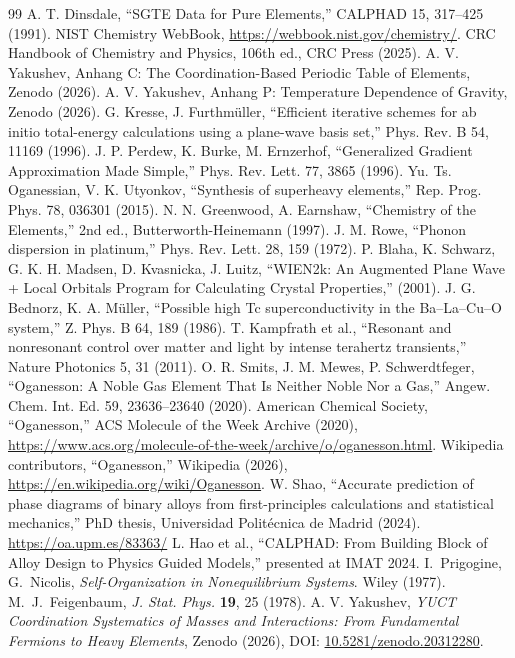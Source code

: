 \documentclass[12pt,a4paper]{article}
\theoremstyle{remark}
\begin{document}
	\begin{thebibliography}{99}
		 A. T. Dinsdale, ``SGTE Data for Pure Elements,'' CALPHAD 15, 317–425 (1991).
		 NIST Chemistry WebBook, \url{https://webbook.nist.gov/chemistry/}.
		 CRC Handbook of Chemistry and Physics, 106th ed., CRC Press (2025).
		 A. V. Yakushev, Anhang C: The Coordination-Based Periodic Table of Elements, Zenodo (2026).
		 A. V. Yakushev, Anhang P: Temperature Dependence of Gravity, Zenodo (2026).
		 G. Kresse, J. Furthmüller, ``Efficient iterative schemes for ab initio total-energy calculations using a plane-wave basis set,'' Phys. Rev. B 54, 11169 (1996).
		 J. P. Perdew, K. Burke, M. Ernzerhof, ``Generalized Gradient Approximation Made Simple,'' Phys. Rev. Lett. 77, 3865 (1996).
		 Yu. Ts. Oganessian, V. K. Utyonkov, ``Synthesis of superheavy elements,'' Rep. Prog. Phys. 78, 036301 (2015).
		 N. N. Greenwood, A. Earnshaw, ``Chemistry of the Elements,'' 2nd ed., Butterworth-Heinemann (1997).
		 J. M. Rowe, ``Phonon dispersion in platinum,'' Phys. Rev. Lett. 28, 159 (1972).
		 P. Blaha, K. Schwarz, G. K. H. Madsen, D. Kvasnicka, J. Luitz, ``WIEN2k: An Augmented Plane Wave + Local Orbitals Program for Calculating Crystal Properties,'' (2001).
		 J. G. Bednorz, K. A. Müller, ``Possible high Tc superconductivity in the Ba–La–Cu–O system,'' Z. Phys. B 64, 189 (1986).
		 T. Kampfrath et al., ``Resonant and nonresonant control over matter and light by intense terahertz transients,'' Nature Photonics 5, 31 (2011).
		 O. R. Smits, J. M. Mewes, P. Schwerdtfeger, ``Oganesson: A Noble Gas Element That Is Neither Noble Nor a Gas,'' Angew. Chem. Int. Ed. 59, 23636–23640 (2020).
		 American Chemical Society, ``Oganesson,'' ACS Molecule of the Week Archive (2020), \url{https://www.acs.org/molecule-of-the-week/archive/o/oganesson.html}.
		 Wikipedia contributors, ``Oganesson,'' Wikipedia (2026), \url{https://en.wikipedia.org/wiki/Oganesson}.
		 W. Shao, ``Accurate prediction of phase diagrams of binary alloys from first-principles calculations and statistical mechanics,'' PhD thesis, Universidad Politécnica de Madrid (2024). \url{https://oa.upm.es/83363/}
		 L. Hao et al., ``CALPHAD: From Building Block of Alloy Design to Physics Guided Models,'' presented at IMAT 2024.
		 I.~Prigogine, G.~Nicolis, \emph{Self-Organization in Nonequilibrium Systems}. Wiley (1977).
		 M.~J.~Feigenbaum, \emph{J. Stat. Phys.} \textbf{19}, 25 (1978).
		 A. V. Yakushev, \emph{YUCT Coordination Systematics of Masses and Interactions: From Fundamental Fermions to Heavy Elements}, Zenodo (2026), DOI: \href{https://doi.org/10.5281/zenodo.20312280}{10.5281/zenodo.20312280}.
	\end{thebibliography}
	
\end{document}
